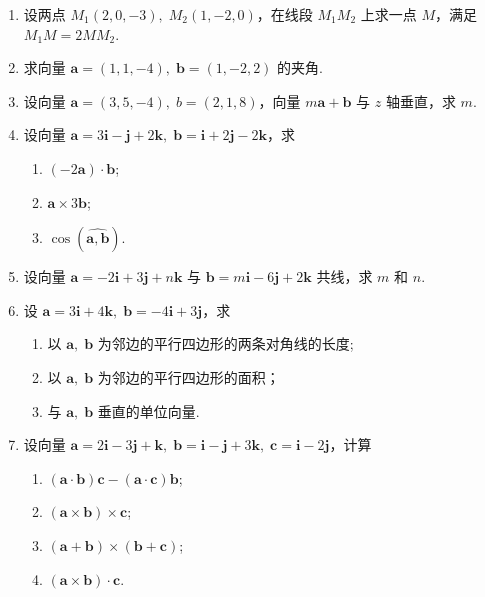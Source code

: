 \begin{enumerate}
    \item 设两点 $M_1(2, 0, -3),\;M_2(1, -2, 0)$，在线段 $M_1M_2$ 上求一点 $M$，满足 $M_1M=2MM_2$.
    
    \item 求向量 $\boldsymbol{a}=(1, 1, -4),\;\boldsymbol{b}=(1, -2, 2)$ 的夹角.
    
    \item 设向量 $\boldsymbol{a}=(3, 5, -4),\;b=(2, 1, 8)$，向量 $m\boldsymbol{a}+\boldsymbol{b}$ 与 $z$ 轴垂直，求 $m$.
    
    \item 设向量 $\boldsymbol{a}=3\boldsymbol{i}-\boldsymbol{j}+2\boldsymbol{k},\;\boldsymbol{b}=\boldsymbol{i}+2\boldsymbol{j}-2\boldsymbol{k}$，求
    \begin{enumerate}[(1)]\setlength{\itemsep}{5pt}\setlength{\topsep}{15pt}
        \item $(-2\boldsymbol{a})\cdot\boldsymbol{b}$;
        \item $\boldsymbol{a}\times3\boldsymbol{b}$;
        \item $\cos(\widehat{\boldsymbol{a}, \boldsymbol{b}})$.
    \end{enumerate}

    \item 设向量 $\boldsymbol{a}=-2\boldsymbol{i}+3\boldsymbol{j}+n\boldsymbol{k}$ 与 $\boldsymbol{b}=m\boldsymbol{i}-6\boldsymbol{j}+2\boldsymbol{k}$ 共线，求 $m$ 和 $n$.  
    
    \item 设 $\boldsymbol{a}=3\boldsymbol{i}+4\boldsymbol{k},\;\boldsymbol{b}=-4\boldsymbol{i}+3\boldsymbol{j}$，求
    \begin{enumerate}[(1)]\setlength{\itemsep}{5pt}\setlength{\topsep}{15pt}
        \item 以 $\boldsymbol{a},\;\boldsymbol{b}$ 为邻边的平行四边形的两条对角线的长度;
        \item 以 $\boldsymbol{a},\;\boldsymbol{b}$ 为邻边的平行四边形的面积；
        \item 与 $\boldsymbol{a},\;\boldsymbol{b}$ 垂直的单位向量.
    \end{enumerate}

    \item 设向量 $\boldsymbol{a}=2\boldsymbol{i}-3\boldsymbol{j}+\boldsymbol{k},\;\boldsymbol{b}=\boldsymbol{i}-\boldsymbol{j}+3\boldsymbol{k},\;\boldsymbol{c}=\boldsymbol{i}-2\boldsymbol{j}$，计算
    \begin{enumerate}[(1)]\setlength{\itemsep}{5pt}\setlength{\topsep}{15pt}
        \item $(\boldsymbol{a}\cdot\boldsymbol{b})\boldsymbol{c}-(\boldsymbol{a}\cdot\boldsymbol{c})\boldsymbol{b}$;
        \item $(\boldsymbol{a}\times\boldsymbol{b})\times\boldsymbol{c}$;
        \item $(\boldsymbol{a}+\boldsymbol{b})\times(\boldsymbol{b}+\boldsymbol{c})$;
        \item $(\boldsymbol{a}\times\boldsymbol{b})\cdot\boldsymbol{c}$.
    \end{enumerate}


\end{enumerate}
